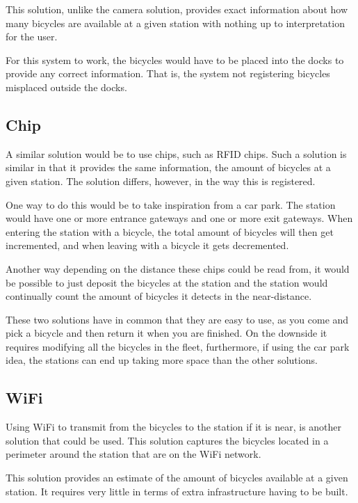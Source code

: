 This solution, unlike the camera solution, provides exact information about how many bicycles are available at a given station with nothing up to interpretation for the user.

For this system to work, the bicycles would have to be placed into the docks to provide any correct information.
That is, the system not registering bicycles misplaced outside the docks.

\subsection{Chip}
A similar solution would be to use chips, such as RFID chips. 
Such a solution is similar in that it provides the same information, the amount of bicycles at a given station.
The solution differs, however, in the way this is registered.

One way to do this would be to take inspiration from a car park.
The station would have one or more entrance gateways and one or more exit gateways.
When entering the station with a bicycle, the total amount of bicycles will then get incremented, and when leaving with a bicycle it gets decremented.

Another way depending on the distance these chips could be read from, it would be possible to just deposit the bicycles at the station and the station would continually count the amount of bicycles it detects in the near-distance.

These two solutions have in common that they are easy to use, as you come and pick a bicycle and then return it when you are finished.
On the downside it requires modifying all the bicycles in the fleet, furthermore, if using the car park idea, the stations can end up taking more space than the other solutions. 

\subsection{WiFi}
Using WiFi to transmit from the bicycles to the station if it is near, is another solution that could be used.
This solution captures the bicycles located in a perimeter around the station that are on the WiFi network.

This solution provides an estimate of the amount of bicycles available at a given station.
It requires very little in terms of extra infrastructure having to be built.

